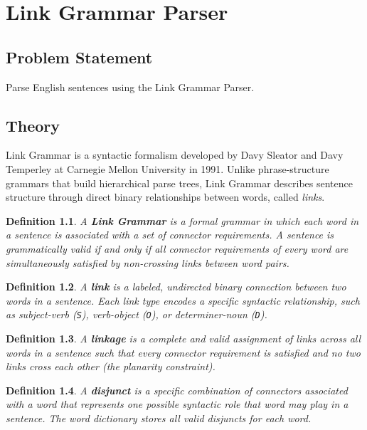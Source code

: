 \documentclass[12pt,a4paper]{report}
\newtheorem{definition}{Definition}
\begin{document}
\chapter{Link Grammar Parser}

\section{Problem Statement}
Parse English sentences using the Link Grammar Parser.
\section{Theory}
Link Grammar is a syntactic formalism developed by Davy Sleator and Davy Temperley at Carnegie Mellon University in 1991. Unlike phrase-structure grammars that build hierarchical parse trees, Link Grammar describes sentence structure through direct binary relationships between words, called \textit{links}.

\begin{definition}
A \textbf{Link Grammar} is a formal grammar in which each word in a sentence is associated with a set of \textit{connector requirements}. A sentence is grammatically valid if and only if all connector requirements of every word are simultaneously satisfied by non-crossing links between word pairs.
\end{definition}

\begin{definition}
A \textbf{link} is a labeled, undirected binary connection between two words in a sentence. Each link type encodes a specific syntactic relationship, such as subject-verb (\texttt{S}), verb-object (\texttt{O}), or determiner-noun (\texttt{D}).
\end{definition}

\begin{definition}
A \textbf{linkage} is a complete and valid assignment of links across all words in a sentence such that every connector requirement is satisfied and no two links cross each other (the planarity constraint).
\end{definition}

\begin{definition}
A \textbf{disjunct} is a specific combination of connectors associated with a word that represents one possible syntactic role that word may play in a sentence. The word dictionary stores all valid disjuncts for each word.
\end{definition}
\end{document}
